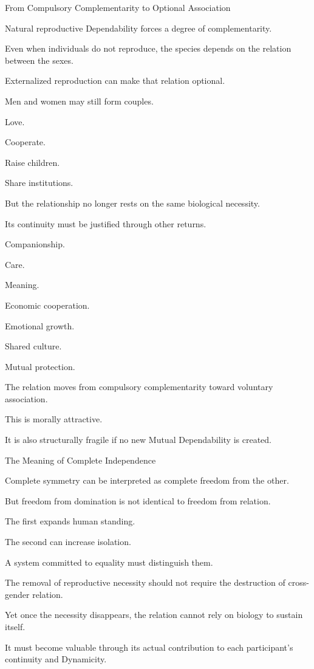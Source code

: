 From Compulsory Complementarity to Optional Association

Natural reproductive Dependability forces a degree of complementarity.

Even when individuals do not reproduce, the species depends on the relation between the sexes.

Externalized reproduction can make that relation optional.

Men and women may still form couples.

Love.

Cooperate.

Raise children.

Share institutions.

But the relationship no longer rests on the same biological necessity.

Its continuity must be justified through other returns.

Companionship.

Care.

Meaning.

Economic cooperation.

Emotional growth.

Shared culture.

Mutual protection.

The relation moves from compulsory complementarity toward voluntary association.

This is morally attractive.

It is also structurally fragile if no new Mutual Dependability is created.

The Meaning of Complete Independence

Complete symmetry can be interpreted as complete freedom from the other.

But freedom from domination is not identical to freedom from relation.

The first expands human standing.

The second can increase isolation.

A system committed to equality must distinguish them.

The removal of reproductive necessity should not require the destruction of cross-gender relation.

Yet once the necessity disappears, the relation cannot rely on biology to sustain itself.

It must become valuable through its actual contribution to each participant’s continuity and Dynamicity.

